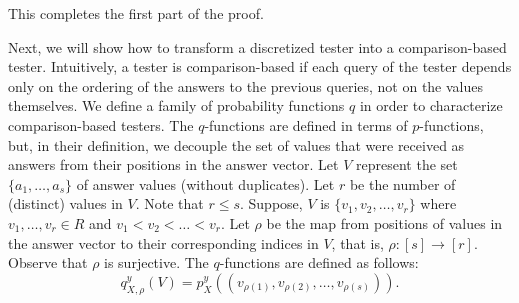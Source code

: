 \noindent This completes the first part of the proof.

Next, we will show how to transform a discretized tester into a comparison-based tester.
Intuitively, a tester is comparison-based if each query of the tester depends only on the ordering of the answers to the previous queries, not on the values themselves.
We define a family of probability functions $q$ in order to characterize comparison-based testers.
The $q$-functions are defined in terms of $p$-functions, but, in their definition, we decouple the set of values that were received as answers from their positions in the answer vector.
Let $V$ represent the set $\{a_1, \ldots, a_s\}$ of answer values (without duplicates).
Let $r$ be the number of (distinct) values in $V$. Note that $r \leq s$.
Suppose, $V$ is $\{v_1, v_2, \ldots, v_r\}$ where $v_1, \ldots, v_r \in R$ and $v_1 < v_2 < \ldots < v_r$.
Let $\rho$ be the map from positions of values in the answer vector to their corresponding indices in $V$, that is, $\rho:[s] \to [r]$. Observe that $\rho$ is surjective.
The $q$-functions are defined as follows:
$$q_{X,\rho}^y(V) = p_X^y((v_{\rho(1)}, v_{\rho(2)}, \ldots,v_{\rho(s)})).$$

